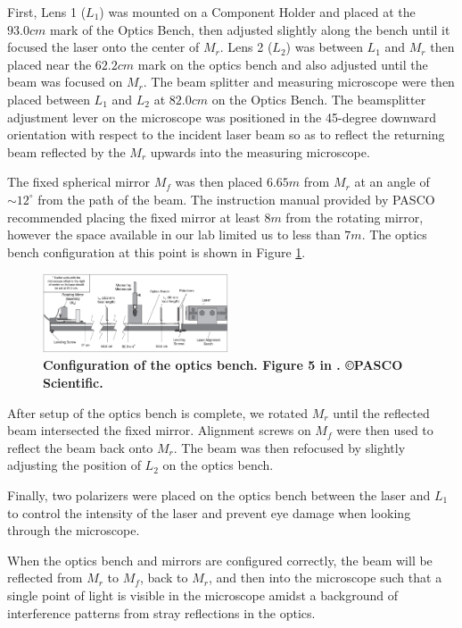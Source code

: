 \documentclass[twocolumn]{article}
\begin{document}
		First, Lens 1 ($L_1$) was mounted on a Component Holder and placed at the $93.0 cm$ mark of the Optics Bench, then adjusted slightly along the bench until it focused the laser onto the center of $M_r$. 
		Lens 2 ($L_2$) was between $L_1$ and $M_r$ then placed near the $62.2 cm$ mark on the optics bench and also adjusted until the beam was focused on $M_r$.  
		The beam splitter and measuring microscope were then placed between $L_1$ and $L_2$ at $82.0 cm$ on the Optics Bench.  
		The beamsplitter adjustment lever on the microscope was positioned in the 45-degree downward orientation with respect to the incident laser beam so as to reflect the returning beam reflected by the $M_r$ upwards into the measuring microscope.
		
		The fixed spherical mirror $M_f$ was then placed $6.65m$ from $M_r$ at an angle of $\sim12^{\circ}$ from the path of the beam.
		The instruction manual provided by PASCO \cite{lee_instruction_????} recommended placing the fixed mirror at least $8m$ from the rotating mirror, however the space available in our lab limited us to less than $7m$.
		The optics bench configuration at this point is shown in Figure \ref{fig:EquipConfig}.
		\begin{figure}[!ht]
			\centering
			\includegraphics[width=0.49\textwidth]{Images/PASCO_EquipmentAlignment.png}
			\caption{\textbf{Configuration of the optics bench. Figure 5 in \cite{lee_instruction_????}. \copyright PASCO Scientific.}}
			\label{fig:EquipConfig}
		\end{figure}
		
		After setup of the optics bench is complete, we rotated $M_r$ until the reflected beam intersected the fixed mirror.
		Alignment screws on $M_f$ were then used to reflect the beam back onto $M_r$.
		The beam was then refocused by slightly adjusting the position of $L_2$ on the optics bench.  
		
		Finally, two polarizers were placed on the optics bench between the laser and $L_1$ to control the intensity of the laser and prevent eye damage when looking through the microscope.
		
		When the optics bench and mirrors are configured correctly, the beam will be reflected from $M_r$ to $M_f$, back to $M_r$, and then into the microscope such that a single point of light is visible in the microscope amidst a background of interference patterns from stray reflections in the optics.
\end{document}
